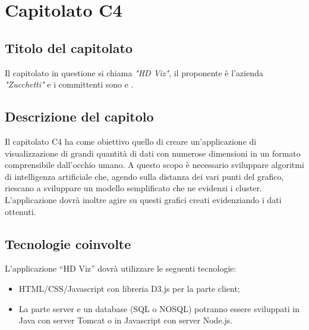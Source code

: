 
\section{Capitolato C4}
\subsection{Titolo del capitolato}
Il capitolato in questione si chiama \textit{"HD Viz"}, il proponente \`e l'azienda \textit{"Zucchetti"} e i committenti sono \VT{} e \CR{}.

\subsection{Descrizione del capitolo}
Il capitolato C4 ha come obiettivo quello di creare un'applicazione di visualizzazione di grandi quantità di dati con numerose dimensioni in un formato comprensibile dall'occhio umano. A questo scopo è necessario sviluppare algoritmi di intelligenza artificiale che, agendo sulla distanza dei vari punti del grafico, riescano a sviluppare un modello semplificato che ne evidenzi i cluster. %
L'applicazione dovrà inoltre agire su questi grafici creati evidenziando i dati ottenuti.

\subsection{Tecnologie coinvolte}
L'applicazione “HD Viz” dovrà utilizzare le seguenti tecnologie:
\begin{itemize}
\item HTML/CSS/Javascript con libreria D3.js per la parte client;
\item La parte server e un database (SQL o NOSQL) potranno essere sviluppati in Java con server Tomcat o in Javascript con server Node.js.
\end{itemize}


